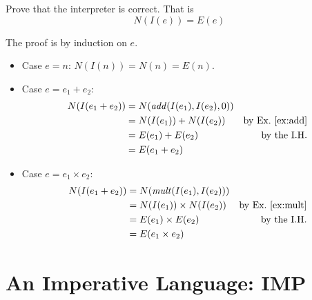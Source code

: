 \documentclass{tufte-handout}
\newcommand{\BR}[1]{(#1)}
\newcommand{\TRUE}[0]{\mathtt{true}}
\newcommand{\FALSE}[0]{\mathtt{false}}
\newcommand{\COND}[3]{#1\,\texttt{?}\,#2\,\texttt{:}\,#3}
\begin{document}
\begin{Exercise}
\label{binary-interp-correct}
 Prove that the interpreter is correct.
 That is
 \[
 N(I\BR{ e }) = E\BR{ e }
 \]
\end{Exercise}
\begin{Answer}
The proof is by induction on $e$.
\begin{itemize}
\item Case $e=n$: 
  $N(I\BR{ n }) = N\BR{ n } = E\BR{ n }$. 
\item Case $e = e_1 + e_2$: 
  \begin{align*}
    N(I\BR{e_1 + e_2}) &= N(\mathit{add}(I\BR{e_1}, I\BR{e_2}, 0)) \\
     & = N(I\BR{e_1}) + N(I\BR{e_2}) & \text{by Ex.~\ref{ex:add}}\\
     & = E\BR{e_1} + E\BR{e_2} & \text{by the I.H.}\\
     & = E\BR{e_1 + e_2}
  \end{align*}

\item Case $e = e_1 \times e_2$: 
  \begin{align*}
    N(I\BR{e_1 + e_2}) &= N(\mathit{mult}(I\BR{e_1}, I\BR{e_2})) \\
     & = N(I\BR{e_1}) \times N(I\BR{e_2}) & \text{by Ex.~\ref{ex:mult}}\\
     & = E\BR{e_1} \times E\BR{e_2} & \text{by the I.H.}\\
     & = E\BR{e_1 \times e_2}
  \end{align*}

\end{itemize}
\end{Answer}





\section{An Imperative Language: IMP}

\end{document}
